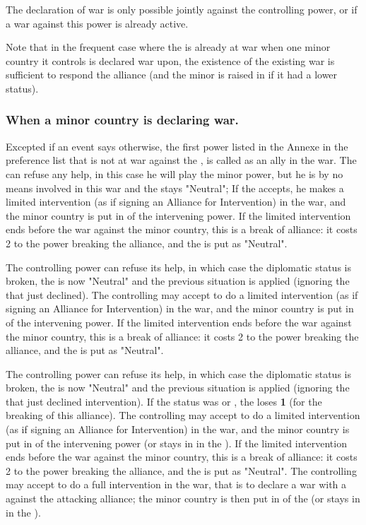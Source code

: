 The declaration of war is only possible jointly against the controlling power,
or if a war against this power is already active.

\aparag Note that in the frequent case where the \MAJ is already at war when
one minor country it controls is declared war upon, the existence of the
existing war is sufficient to respond the alliance (and the minor is raised in
\EW if it had a lower status).


\subsubsection{When a minor country is declaring war.}
Excepted if an event says otherwise, the first power listed in the Annexe in
the preference list that is not at war against the \MIN, is called as an ally
in the war.
\bparag The \MAJ can refuse any help, in this case he will play the minor
power, but he is by no means involved in this war and the \MIN stays
"Neutral";
\bparag If the \MAJ accepts, he makes a limited intervention (as if signing an
Alliance for Intervention) in the war, and the minor country is put in \AM of
the intervening power.
\bparag If the limited intervention ends before the war against the minor
country, this is a break of alliance: it costs 2 \STAB to the power breaking
the alliance, and the \MIN is put as "Neutral".

\bparag The controlling power can refuse its help, in which case the
diplomatic status is broken, the \MIN is now "Neutral" and the previous
situation is applied (ignoring the \MAJ that just declined).
\bparag The controlling \MAJ may accept to do a limited intervention (as if
signing an Alliance for Intervention) in the war, and the minor country is put
in \AM of the intervening power.
\bparag If the limited intervention ends before the war against the minor
country, this is a break of alliance: it costs 2 \STAB to the power breaking
the alliance, and the \MIN is put as "Neutral".

\bparag The controlling power can refuse its help, in which case the
diplomatic status is broken, the \MIN is now "Neutral" and the previous
situation is applied (ignoring the \MAJ that just declined intervention). If
the status was \EG or \dipAT, the \MAJ loses {\bf 1} \STAB (for the breaking
of this alliance).
\bparag The controlling \MAJ may accept to do a limited intervention (as if
signing an Alliance for Intervention) in the war, and the minor country is put
in \AM of the intervening power (or stays in \dipAT in the \ROTW).
\bparag If the limited intervention ends before the war against the minor
country, this is a break of alliance: it costs 2 \STAB to the power breaking
the alliance, and the \MIN is put as "Neutral".
\bparag The controlling \MAJ may accept to do a full intervention in the war,
that is to declare a war with a \CB against the attacking alliance; the minor
country is then put in \EG of the \MAJ (or stays in \dipAT in the \ROTW).

